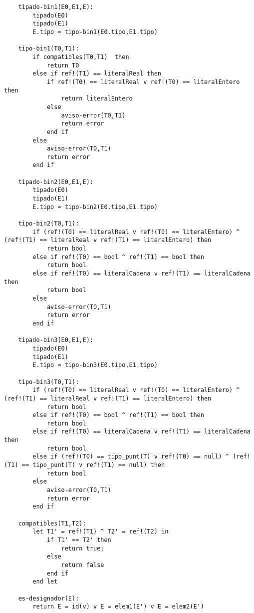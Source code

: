 \begin{lstlisting}
    tipado-bin1(E0,E1,E):
        tipado(E0)
        tipado(E1)
        E.tipo = tipo-bin1(E0.tipo,E1.tipo)

    tipo-bin1(T0,T1):
        if compatibles(T0,T1)  then
            return T0
        else if ref!(T1) == literalReal then
            if ref!(T0) == literalReal v ref!(T0) == literalEntero then
                return literalEntero
            else 
                aviso-error(T0,T1)
                return error
            end if
        else
            aviso-error(T0,T1)
            return error
        end if

    tipado-bin2(E0,E1,E):
        tipado(E0)
        tipado(E1)
        E.tipo = tipo-bin2(E0.tipo,E1.tipo)

    tipo-bin2(T0,T1):
        if (ref!(T0) == literalReal v ref!(T0) == literalEntero) ^ (ref!(T1) == literalReal v ref!(T1) == literalEntero) then
            return bool
        else if ref!(T0) == bool ^ ref!(T1) == bool then
            return bool
        else if ref!(T0) == literalCadena v ref!(T1) == literalCadena then 
            return bool
        else
            aviso-error(T0,T1)
            return error
        end if

    tipado-bin3(E0,E1,E):
        tipado(E0)
        tipado(E1)
        E.tipo = tipo-bin3(E0.tipo,E1.tipo)

    tipo-bin3(T0,T1):
        if (ref!(T0) == literalReal v ref!(T0) == literalEntero) ^ (ref!(T1) == literalReal v ref!(T1) == literalEntero) then
            return bool
        else if ref!(T0) == bool ^ ref!(T1) == bool then
            return bool
        else if ref!(T0) == literalCadena v ref!(T1) == literalCadena then 
            return bool
        else if (ref!(T0) == tipo_punt(T) v ref!(T0) == null) ^ (ref!(T1) == tipo_punt(T) v ref!(T1) == null) then
            return bool
        else
            aviso-error(T0,T1)
            return error
        end if

    compatibles(T1,T2):
        let T1' = ref!(T1) ^ T2' = ref!(T2) in
            if T1' == T2' then
                return true;
            else
                return false
            end if
        end let

    es-designador(E):
        return E = id(v) v E = elem1(E') v E = elem2(E')

\end{lstlisting}
